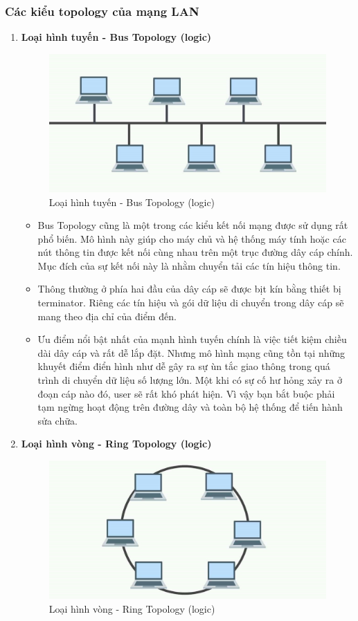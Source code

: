 \documentclass[13pt]{article}
\begin{document}
\subsubsection{Các kiểu topology của mạng LAN}
\begin{enumerate}
    \item \textbf{Loại hình tuyến - Bus Topology (logic)}
    \begin{figure}[h!]
        \centering
        \includegraphics[width=0.7\linewidth]{image/6.jpg}
            \caption{Loại hình tuyến - Bus Topology (logic)}
            \label{fig:label1}
    \end{figure}

    \begin{itemize}
        \item Bus Topology cũng là một trong các kiểu kết nối mạng được sử dụng rất phổ biến. Mô hình này giúp cho máy chủ và hệ thống máy tính hoặc các nút thông tin được kết nối cùng nhau trên một trục đường dây cáp chính. Mục đích của sự kết nối này là nhằm chuyển tải các tín hiệu thông tin.
        \item Thông thường ở phía hai đầu của dây cáp sẽ được bịt kín bằng thiết bị terminator. Riêng các tín hiệu và gói dữ liệu di chuyển trong dây cáp sẽ mang theo địa chỉ của điểm đến.
        \item Ưu điểm nổi bật nhất của mạnh hình tuyến chính là việc tiết kiệm chiều dài dây cáp và rất dễ lắp đặt. Nhưng mô hình mạng cũng tồn tại những khuyết điểm điển hình như dễ gây ra sự ùn tắc giao thông trong quá trình di chuyển dữ liệu số lượng lớn. Một khi có sự cố hư hỏng xảy ra ở đoạn cáp nào đó, user sẽ rất khó phát hiện. Vì vậy bạn bắt buộc phải tạm ngừng hoạt động trên đường dây và toàn bộ hệ thống để tiến hành sửa chữa.
    \end{itemize}

    \item \textbf{Loại hình vòng - Ring Topology (logic)}
    \begin{figure}[h!]
        \centering
        \includegraphics[width=0.7\linewidth]{image/11.jpg}
            \caption{Loại hình vòng - Ring Topology (logic)}
            \label{fig:label1}
    \end{figure}


\end{enumerate}
\end{document}
